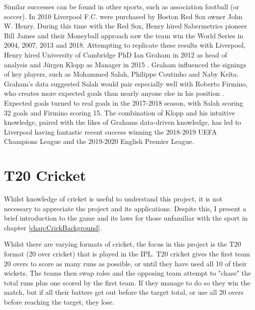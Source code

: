 \documentclass[12pt,a4paper]{report}
\theoremstyle{definition}
\begin{document}
Similar successes can be found in other sports, such as association football (or soccer). 
In 2010 Liverpool F.C. were purchased by Boston Red Sox owner John W. Henry. 
During this time with the Red Sox, Henry hired Sabermetrics pioneer Bill James and their Moneyball approach saw the team win the World Series in 2004, 2007, 2013 and 2018. 
Attempting to replicate these results with Liverpool, Henry hired University of Cambridge PhD Ian Graham in 2012 as head of analysis and J\"urgen Klopp as Manager in 2015 \citep{Liverpool2022}. 
Graham influenced the signings of key players, such as Mohammed Salah, Philippe Coutinho and Naby Ke\"ita. 
Graham's data suggested Salah would pair especially well with Roberto Firmino, who creates more expected goals than nearly anyone else in his position \citep{Liverpool2019}. 
Expected goals turned to real goals in the 2017-2018 season, with Salah scoring 32 goals and Firmino scoring 15. 
The combination of Klopp and his intuitive knowledge, paired with the likes of Grahams data-driven knowledge, has led to Liverpool having fantastic recent success winning the 2018-2019 UEFA Champions League and the 2019-2020 English Premier League.

\section{T20 Cricket} \label{sec:T20Cricket}

Whilst knowledge of cricket is useful to understand this project, it is not necessary to appreciate the project and its applications.
Despite this, I present a brief introduction to the game and its laws for those unfamiliar with the sport in chapter \ref{chap:CrickBackground}.

Whilst there are varying formats of cricket, the focus in this project is the T20 format (20 over cricket) that is played in the IPL.
T20 cricket gives the first team 20 overs to score as many runs as possible, or until they have used all 10 of their wickets.
The teams then swap roles and the opposing team attempt to "chase" the total runs plus one scored by the first team. 
If they manage to do so they win the match, but if all their batters get out before the target total, or use all 20 overs before reaching the target, they lose.
\end{document}
